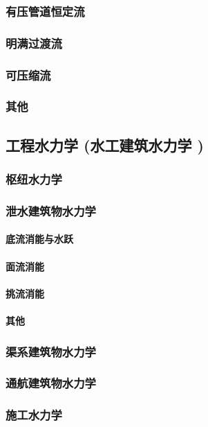 \documentclass[UTF8]{../../ApplicationUniverse}
\begin{document}
        \subsubsection{有压管道恒定流}
        \subsubsection{明满过渡流}
        \subsubsection{可压缩流}
        \subsubsection{其他}
    \subsection{工程水力学 (水工建筑水力学 )}
        \subsubsection{枢纽水力学}
        \subsubsection{泄水建筑物水力学}
            \paragraph{底流消能与水跃}
            \paragraph{面流消能}
            \paragraph{挑流消能}
            \paragraph{其他}
        \subsubsection{渠系建筑物水力学}
        \subsubsection{通航建筑物水力学}
        \subsubsection{施工水力学}
\end{document}
